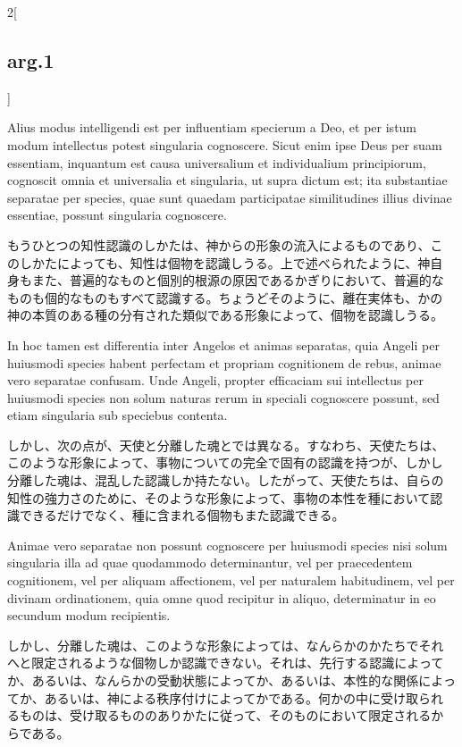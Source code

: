 \documentclass[paper=a4paper,fontsize=10pt,jafontsize=9pt,titlepage]{jlreq}
\begin{document}
\begin{paracol}{2}[\subsection{arg.1}]
\switchcolumn*

Alius modus intelligendi est per influentiam specierum a Deo, et per
istum modum intellectus potest singularia cognoscere. Sicut enim ipse
Deus per suam essentiam, inquantum est causa universalium et
individualium principiorum, cognoscit omnia et universalia et
singularia, ut supra dictum est; ita substantiae separatae per
species, quae sunt quaedam participatae similitudines illius divinae
essentiae, possunt singularia cognoscere.

\switchcolumn

もうひとつの知性認識のしかたは、神からの形象の流入によるものであり、こ
のしかたによっても、知性は個物を認識しうる。上で述べられたように、神自
身もまた、普遍的なものと個別的根源の原因であるかぎりにおいて、普遍的な
ものも個的なものもすべて認識する。ちょうどそのように、離在実体も、かの
神の本質のある種の分有された類似である形象によって、個物を認識しうる。

\switchcolumn*

In hoc tamen est differentia inter Angelos et animas separatas, quia
Angeli per huiusmodi species habent perfectam et propriam cognitionem
de rebus, animae vero separatae confusam. Unde Angeli, propter
efficaciam sui intellectus per huiusmodi species non solum naturas
rerum in speciali cognoscere possunt, sed etiam singularia sub
speciebus contenta.

\switchcolumn

しかし、次の点が、天使と分離した魂とでは異なる。すなわち、天使たちは、
このような形象によって、事物についての完全で固有の認識を持つが、しかし
分離した魂は、混乱した認識しか持たない。したがって、天使たちは、自らの
知性の強力さのために、そのような形象によって、事物の本性を種において認
識できるだけでなく、種に含まれる個物もまた認識できる。

\switchcolumn*

Animae vero separatae non possunt cognoscere per huiusmodi species
nisi solum singularia illa ad quae quodammodo determinantur, vel per
praecedentem cognitionem, vel per aliquam affectionem, vel per
naturalem habitudinem, vel per divinam ordinationem, quia omne quod
recipitur in aliquo, determinatur in eo secundum modum recipientis.

\switchcolumn

しかし、分離した魂は、このような形象によっては、なんらかのかたちでそれ
へと限定されるような個物しか認識できない。それは、先行する認識によって
か、あるいは、なんらかの受動状態によってか、あるいは、本性的な関係によっ
てか、あるいは、神による秩序付けによってかである。何かの中に受け取られ
るものは、受け取るもののありかたに従って、そのものにおいて限定されるか
らである。


\end{paracol}
\end{document}
